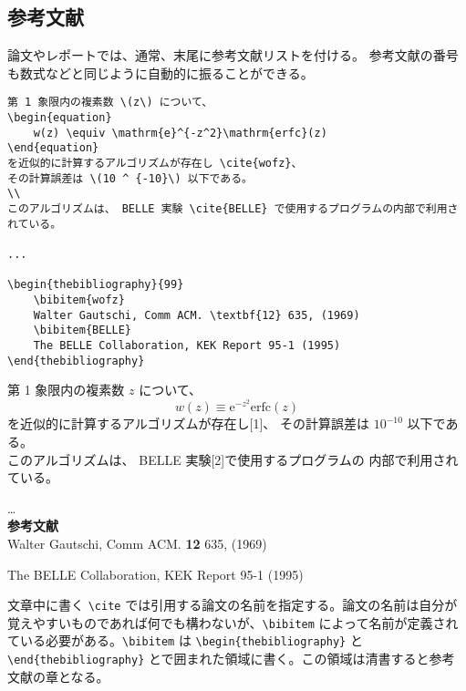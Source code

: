 \subsection{参考文献}
\label{sec:latex:bibliography}

論文やレポートでは、通常、末尾に参考文献リストを付ける。
参考文献の番号も数式などと同じように自動的に振ることができる。
\begin{reidai}
    \begin{verbatim}
第 1 象限内の複素数 \(z\) について、
\begin{equation}
    w(z) \equiv \mathrm{e}^{-z^2}\mathrm{erfc}(z)
\end{equation}
を近似的に計算するアルゴリズムが存在し \cite{wofz}、
その計算誤差は \(10 ^ {-10}\) 以下である。
\\
このアルゴリズムは、 BELLE 実験 \cite{BELLE} で使用するプログラムの内部で利用されている。

...

\begin{thebibliography}{99}
    \bibitem{wofz}
    Walter Gautschi, Comm ACM. \textbf{12} 635, (1969)
    \bibitem{BELLE}
    The BELLE Collaboration, KEK Report 95-1 (1995)
\end{thebibliography}
\end{verbatim}
\end{reidai}
\setcounter{equation}{0}
\vspace*{-1.5em}
\begin{kekka}
    \hspace*{0.3cm}第 1 象限内の複素数 \(z\) について、
    \begin{equation}
        w(z) \equiv \mathrm{e}^{-z^2}\mathrm{erfc}(z)
    \end{equation}
    を近似的に計算するアルゴリズムが存在し[1]、
    その計算誤差は \(10 ^ {-10}\) 以下である。
    \\
    このアルゴリズムは、 BELLE 実験[2]で使用するプログラムの
    内部で利用されている。

    \dots \\[.2em]

    \noindent \textbf{\Large 参考文献} \\[.2em]

    \noindent [1] Walter Gautschi, Comm ACM. \textbf{12} 635, (1969)

    \noindent [2] The BELLE Collaboration, KEK Report 95-1 (1995)
\end{kekka} \noindent
文章中に書く \verb|\cite| では引用する論文の名前を指定する。論文の名前は自分が覚えやすいものであれば何でも構わないが、\verb|\bibitem| によって名前が定義されている必要がある。\verb|\bibitem| は \verb|\begin{thebibliography}| と \verb|\end{thebibliography}| とで囲まれた領域に書く。この領域は清書すると参考文献の章となる。

